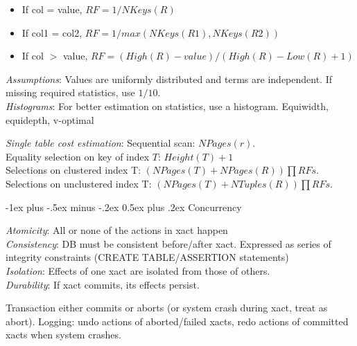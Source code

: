 \documentclass[10pt,landscape]{article}
\makeatletter
\renewcommand{\section}{\@startsection{section}{1}{0mm}%
                                {-1ex plus -.5ex minus -.2ex}%
                                {0.5ex plus .2ex}%
                                {\normalfont\large\bfseries}}
\makeatother
\begin{document}
\begin{multicols}{3}
\begin{itemize}
  \item If col = value, $RF = 1 / NKeys(R)$
  \item If col1 = col2, $RF = 1 / max(NKeys(R1), NKeys(R2))$
  \item If col $>$ value, $RF = (High(R)-value) / (High(R) - Low(R) + 1)$
\end{itemize}

\textit{Assumptions}: Values are uniformly distributed and terms are independent. If missing required statistics, use $1/10$. \\
\textit{Histograms}: For better estimation on statistics, use a histogram. Equiwidth, equidepth, v-optimal


\textit{Single table cost estimation}: Sequential scan: $NPages(r)$. \\
Equality selection on key of index $T$: $Height(T) + 1$ \\
Selections on clustered index T: $(NPages(T) + NPages(R)) \prod RFs$. \\
Selections on unclustered index T: $(NPages(T) + NTuples(R)) \prod RFs$.


\section{Concurrency}

\textit{Atomicity}: All or none of the actions in xact happen \\
\textit{Consistency}: DB must be consistent before/after xact. Expressed as series of integrity constraints (CREATE TABLE/ASSERTION statements) \\
\textit{Isolation}: Effects of one xact are isolated from those of others. \\
\textit{Durability}: If xact commits, its effects persist.

Transaction either commits or aborts (or system crash during xact, treat as abort). Logging: undo actions of aborted/failed xacts, redo actions of committed xacts when system crashes.


\end{multicols}
\end{document}
